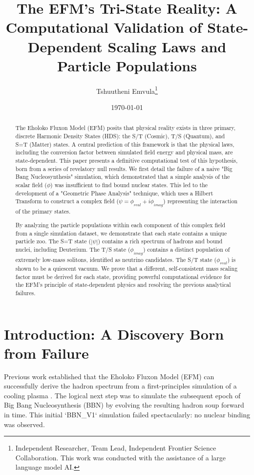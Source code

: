 \documentclass[11pt]{article}
\title{The EFM's Tri-State Reality: A Computational Validation of State-Dependent Scaling Laws and Particle Populations}
\author{Tshuutheni Emvula\thanks{Independent Researcher, Team Lead, Independent Frontier Science Collaboration. This work was conducted with the assistance of a large language model AI.}}
\date{\today}
\begin{document}
\maketitle

\begin{abstract}
The Eholoko Fluxon Model (EFM) posits that physical reality exists in three primary, discrete Harmonic Density States (HDS): the S/T (Cosmic), T/S (Quantum), and S=T (Matter) states. A central prediction of this framework is that the physical laws, including the conversion factor between simulated field energy and physical mass, are state-dependent. This paper presents a definitive computational test of this hypothesis, born from a series of revelatory null results. We first detail the failure of a naive "Big Bang Nucleosynthesis" simulation, which demonstrated that a simple analysis of the scalar field (\(\phi\)) was insufficient to find bound nuclear states. This led to the development of a "Geometric Phase Analysis" technique, which uses a Hilbert Transform to construct a complex field (\(\psi = \phi_{real} + i\phi_{imag}\)) representing the interaction of the primary states.

By analyzing the particle populations within each component of this complex field from a single simulation dataset, we demonstrate that each state contains a unique particle zoo. The S=T state (\(|\psi|\)) contains a rich spectrum of hadrons and bound nuclei, including Deuterium. The T/S state (\(\phi_{imag}\)) contains a distinct population of extremely low-mass solitons, identified as neutrino candidates. The S/T state (\(\phi_{real}\)) is shown to be a quiescent vacuum. We prove that a different, self-consistent mass scaling factor must be derived for each state, providing powerful computational evidence for the EFM's principle of state-dependent physics and resolving the previous analytical failures.
\end{abstract}

\section{Introduction: A Discovery Born from Failure}
Previous work established that the Eholoko Fluxon Model (EFM) can successfully derive the hadron spectrum from a first-principles simulation of a cooling plasma \citep{emvula2025hadron_spectrum}. The logical next step was to simulate the subsequent epoch of Big Bang Nucleosynthesis (BBN) by evolving the resulting hadron soup forward in time. This initial `BBN_V1` simulation failed spectacularly: no nuclear binding was observed.
\end{document}
